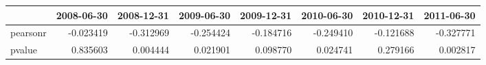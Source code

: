 \begin{tabular}{lrrrrrrr}
\toprule
{} &  2008-06-30 &  2008-12-31 &  2009-06-30 &  2009-12-31 &  2010-06-30 &  2010-12-31 &  2011-06-30 \\
\midrule
pearsonr &   -0.023419 &   -0.312969 &   -0.254424 &   -0.184716 &   -0.249410 &   -0.121688 &   -0.327771 \\
pvalue   &    0.835603 &    0.004444 &    0.021901 &    0.098770 &    0.024741 &    0.279166 &    0.002817 \\
\bottomrule
\end{tabular}
